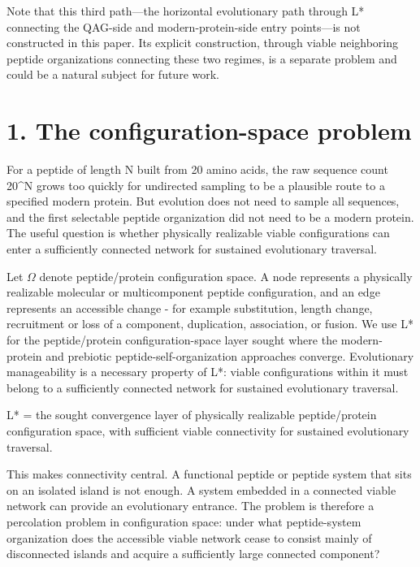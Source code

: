 \documentclass[11pt]{article}
\begin{document}
Note that this third path---the horizontal evolutionary path through L* connecting the QAG-side and modern-protein-side entry points---is not constructed in this paper. Its explicit construction, through viable neighboring peptide organizations connecting these two regimes, is a separate problem and could be a natural subject for future work.

\hypertarget{the-configuration-space-problem}{%
\section*{1. The configuration-space problem}\label{the-configuration-space-problem}}

For a peptide of length N built from 20 amino acids, the raw sequence count 20\^{}N grows too quickly for undirected sampling to be a plausible route to a specified modern protein. But evolution does not need to sample all sequences, and the first selectable peptide organization did not need to be a modern protein. The useful question is whether physically realizable viable configurations can enter a sufficiently connected network for sustained evolutionary traversal.

Let $\Omega$ denote peptide/protein configuration space. A node represents a physically realizable molecular or multicomponent peptide configuration, and an edge represents an accessible change - for example substitution, length change, recruitment or loss of a component, duplication, association, or fusion. We use L* for the peptide/protein configuration-space layer sought where the modern-protein and prebiotic peptide-self-organization approaches converge. Evolutionary manageability is a necessary property of L*: viable configurations within it must belong to a sufficiently connected network for sustained evolutionary traversal.

L* = the sought convergence layer of physically realizable peptide/protein configuration space, with sufficient viable connectivity for sustained evolutionary traversal.

This makes connectivity central. A functional peptide or peptide system that sits on an isolated island is not enough. A system embedded in a connected viable network can provide an evolutionary entrance. The problem is therefore a percolation problem in configuration space: under what peptide-system organization does the accessible viable network cease to consist mainly of disconnected islands and acquire a sufficiently large connected component?
\end{document}

